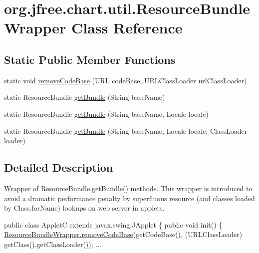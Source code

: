 \hypertarget{classorg_1_1jfree_1_1chart_1_1util_1_1_resource_bundle_wrapper}{}\section{org.\+jfree.\+chart.\+util.\+Resource\+Bundle\+Wrapper Class Reference}
\label{classorg_1_1jfree_1_1chart_1_1util_1_1_resource_bundle_wrapper}
\subsection*{Static Public Member Functions}
\begin{DoxyCompactItemize}
\item 
static void \mbox{\hyperlink{classorg_1_1jfree_1_1chart_1_1util_1_1_resource_bundle_wrapper_a971d597aa0d4f265bc4212a7b6664247}{remove\+Code\+Base}} (U\+RL code\+Base, U\+R\+L\+Class\+Loader url\+Class\+Loader)
\item 
static Resource\+Bundle \mbox{\hyperlink{classorg_1_1jfree_1_1chart_1_1util_1_1_resource_bundle_wrapper_a39805e0185403d584f5a99ca744edc29}{get\+Bundle}} (String base\+Name)
\item 
static Resource\+Bundle \mbox{\hyperlink{classorg_1_1jfree_1_1chart_1_1util_1_1_resource_bundle_wrapper_a43c188d437a10ea24572bd679bc1390c}{get\+Bundle}} (String base\+Name, Locale locale)
\item 
static Resource\+Bundle \mbox{\hyperlink{classorg_1_1jfree_1_1chart_1_1util_1_1_resource_bundle_wrapper_ac315577a435d5b2cae81bec4b89d53bc}{get\+Bundle}} (String base\+Name, Locale locale, Class\+Loader loader)
\end{DoxyCompactItemize}


\subsection{Detailed Description}
Wrapper of Resource\+Bundle.\+get\+Bundle() methods. This wrapper is introduced to avoid a dramatic performance penalty by superfluous resource (and classes loaded by Class.\+for\+Name) lookups on web server in applets.


\begin{DoxyPre}
public class AppletC extends javax.swing.JApplet \{
   public void init() \{
      \mbox{\hyperlink{classorg_1_1jfree_1_1chart_1_1util_1_1_resource_bundle_wrapper_a971d597aa0d4f265bc4212a7b6664247}{ResourceBundleWrapper.removeCodeBase}}(getCodeBase(),
              (URLClassLoader) getClass().getClassLoader());
   ...
\end{DoxyPre}


